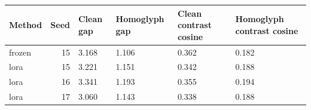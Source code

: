 \begin{tabular}{lrllll}
\toprule
Method & Seed & Clean gap & Homoglyph gap & Clean contrast cosine & Homoglyph contrast cosine\\
\midrule
frozen & 15 & 3.168 & 1.106 & 0.362 & 0.182\\
lora & 15 & 3.221 & 1.151 & 0.342 & 0.188\\
lora & 16 & 3.341 & 1.193 & 0.355 & 0.194\\
lora & 17 & 3.060 & 1.143 & 0.338 & 0.188\\
\bottomrule\end{tabular}
